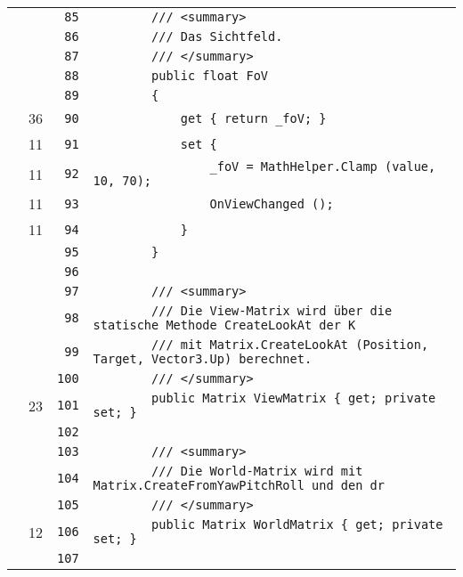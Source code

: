 \documentclass[a4paper,10pt]{article}
\begin{document}
\begin{longtable}[l]{lrrl}
\cellcolor{gray} &  & \verb~85~ & \verb~        /// <summary>~\\
\cellcolor{gray} &  & \verb~86~ & \verb~        /// Das Sichtfeld.~\\
\cellcolor{gray} &  & \verb~87~ & \verb~        /// </summary>~\\
\cellcolor{gray} &  & \verb~88~ & \verb~        public float FoV~\\
\cellcolor{gray} &  & \verb~89~ & \verb~        {~\\
\cellcolor{green} & 36 & \verb~90~ & \verb~            get { return _foV; }~\\
\cellcolor{green} & 11 & \verb~91~ & \verb~            set {~\\
\cellcolor{green} & 11 & \verb~92~ & \verb~                _foV = MathHelper.Clamp (value, 10, 70);~\\
\cellcolor{green} & 11 & \verb~93~ & \verb~                OnViewChanged ();~\\
\cellcolor{green} & 11 & \verb~94~ & \verb~            }~\\
\cellcolor{gray} &  & \verb~95~ & \verb~        }~\\
\cellcolor{gray} &  & \verb~96~ & \verb~~\\
\cellcolor{gray} &  & \verb~97~ & \verb~        /// <summary>~\\
\cellcolor{gray} &  & \verb~98~ & \verb~        /// Die View-Matrix wird über die statische Methode CreateLookAt der K~\\
\cellcolor{gray} &  & \verb~99~ & \verb~        /// mit Matrix.CreateLookAt (Position, Target, Vector3.Up) berechnet.~\\
\cellcolor{gray} &  & \verb~100~ & \verb~        /// </summary>~\\
\cellcolor{green} & 23 & \verb~101~ & \verb~        public Matrix ViewMatrix { get; private set; }~\\
\cellcolor{gray} &  & \verb~102~ & \verb~~\\
\cellcolor{gray} &  & \verb~103~ & \verb~        /// <summary>~\\
\cellcolor{gray} &  & \verb~104~ & \verb~        /// Die World-Matrix wird mit Matrix.CreateFromYawPitchRoll und den dr~\\
\cellcolor{gray} &  & \verb~105~ & \verb~        /// </summary>~\\
\cellcolor{green} & 12 & \verb~106~ & \verb~        public Matrix WorldMatrix { get; private set; }~\\
\cellcolor{gray} &  & \verb~107~ & \verb~~\\

\end{longtable}
\end{document}
